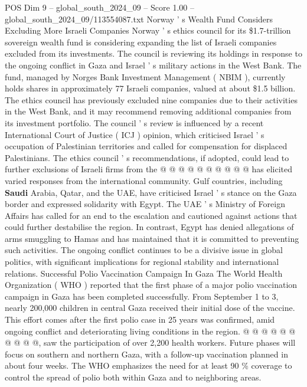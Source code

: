 \begin{textsample}{POS Dim 9 – global\_south\_2024\_09 – Score 1.00 – global\_south\_2024\_09/113554087.txt}
Norway ' s Wealth Fund Considers Excluding More Israeli Companies Norway ' s ethics council for its \$1.7-trillion sovereign wealth fund is considering expanding the list of Israeli companies excluded from its investments.
The council is reviewing its holdings in response to the ongoing conflict in Gaza and Israel ' s military actions in the West Bank.
The fund, managed by Norges Bank Investment Management ( NBIM ), currently holds shares in approximately 77 Israeli companies, valued at about \$1.5 billion.
The ethics council has previously excluded nine companies due to their activities in the West Bank, and it may recommend removing additional companies from its investment portfolio.
The council ' s review is influenced by a recent International Court of Justice ( ICJ ) opinion, which criticised Israel ' s occupation of Palestinian territories and called for compensation for displaced Palestinians.
The ethics council ' s recommendations, if adopted, could lead to further exclusions of Israeli firms from the @ @ @ @ @ @ @ @ @ @ has elicited varied responses from the international community.
Gulf countries, including \textbf{Saudi} Arabia, Qatar, and the UAE, have criticised Israel ' s stance on the Gaza border and expressed solidarity with Egypt.
The UAE ' s Ministry of Foreign Affairs has called for an end to the escalation and cautioned against actions that could further destabilise the region.
In contrast, Egypt has denied allegations of arms smuggling to Hamas and has maintained that it is committed to preventing such activities.
The ongoing conflict continues to be a divisive issue in global politics, with significant implications for regional stability and international relations.
Successful Polio Vaccination Campaign In Gaza The World Health Organization ( WHO ) reported that the first phase of a major polio vaccination campaign in Gaza has been completed successfully.
From September 1 to 3, nearly 200,000 children in central Gaza received their initial dose of the vaccine.
This effort comes after the first polio case in 25 years was confirmed, amid ongoing conflict and deteriorating living conditions in the region. @ @ @ @ @ @ @ @ @ @, saw the participation of over 2,200 health workers.
Future phases will focus on southern and northern Gaza, with a follow-up vaccination planned in about four weeks.
The WHO emphasizes the need for at least 90 \% coverage to control the spread of polio both within Gaza and to neighboring areas.

\end{textsample}

